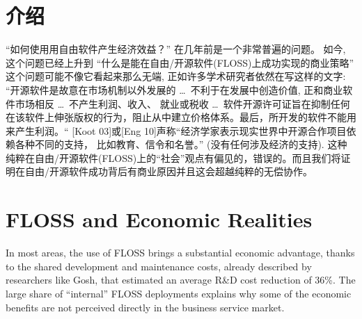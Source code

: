 

\section*{介绍}

“如何使用用自由软件产生经济效益？” 在几年前是一个非常普遍的问题。 如今, 这个问题已经上升到 “什么是能在自由/开源软件(FLOSS)上成功实现的商业策略” 这个问题可能不像它看起来那么无端, 正如许多学术研究者依然在写这样的文字: “开源软件是故意在市场机制以外发展的 \dots\ 不利于在发展中创造价值, 正和商业软件市场相反 \dots\ 不产生利润、收入、 就业或税收 \dots\ 软件开源许可证旨在抑制任何在该软件上伸张版权的行为，阻止从中建立价格体系。最后，所开发的软件不能用来产生利润。“ [Koot 03]或[Eng 10]声称“经济学家表示现实世界中开源合作项目依赖各种不同的支持， 比如教育、信令和名誉。” (没有任何涉及经济的支持). 这种纯粹在自由/开源软件(FLOSS)上的“社会”观点有偏见的，错误的。而且我们将证明在自由/开源软件成功背后有商业原因并且这会超越纯粹的无偿协作。

\section*{FLOSS and Economic Realities}

In most areas, the use of FLOSS brings a substantial economic advantage,
thanks to the shared development and maintenance costs, already described by
researchers like Gosh, that estimated an average R\&D cost reduction of 36\%.
The large share of ``internal'' FLOSS deployments explains why some of the economic benefits are not perceived directly in the business service market.

